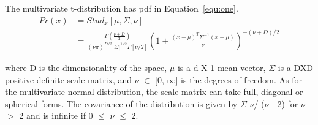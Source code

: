 \documentclass[10pt,twocolumn,letterpaper]{article}
\begin{document}
The multivariate t-distribution has pdf in Equation~\ref{equ:one}.
\begin{equation}
\begin{split}
Pr(x) & = Stud_x[\mu, \Sigma, \nu] \\
& = \frac{\Gamma(\frac{\nu+D}{2})}{(\nu \pi)^{D/2}|\Sigma|^{1/2}\Gamma{[\nu/2]}}(1+\frac{(x-\mu)^T\Sigma^{-1}(x-\mu)}{\nu})^{-(\nu+D)/2}
\end{split}
\label{equ:two}
\end{equation}

where D is the dimensionality of the space, $\mu$ is a d X 1 mean vector, $\Sigma$ is a DXD positive definite scale matrix, and $\nu$ $\in$ [0, $\infty$] is the degrees of freedom. As for the multivariate normal distribution, the scale matrix can take full, diagonal or spherical forms. The covariance of the distribution is given by $\Sigma$ $\nu$/ ($\nu$ - 2) for $\nu$ $>$ 2 and is infinite if 0 $\leq$ $\nu$ $\leq$ 2.



{\small


}
\end{document}
